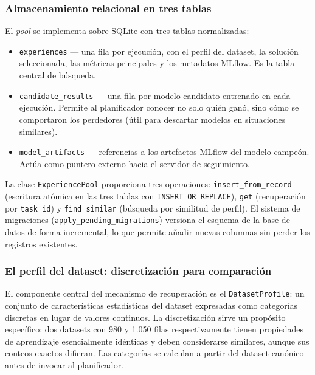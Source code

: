 \subsubsection*{Almacenamiento relacional en tres tablas}
\label{sec:experience-storage}

El \emph{pool} se implementa sobre SQLite con tres tablas normalizadas:

\begin{itemize}
  \item \texttt{experiences} — una fila por ejecución, con el perfil del dataset, la solución seleccionada, las métricas principales y los metadatos MLflow. Es la tabla central de búsqueda.
  \item \texttt{candidate\_results} — una fila por modelo candidato entrenado en cada ejecución. Permite al planificador conocer no solo quién ganó, sino cómo se comportaron los perdedores (útil para descartar modelos en situaciones similares).
  \item \texttt{model\_artifacts} — referencias a los artefactos MLflow del modelo campeón. Actúa como puntero externo hacia el servidor de seguimiento.
\end{itemize}

La clase \texttt{ExperiencePool} proporciona tres operaciones: \texttt{insert\_from\_record} (escritura atómica en las tres tablas con \texttt{INSERT OR REPLACE}), \texttt{get} (recuperación por \texttt{task\_id}) y \texttt{find\_similar} (búsqueda por similitud de perfil). El sistema de migraciones (\texttt{apply\_pending\_migrations}) versiona el esquema de la base de datos de forma incremental, lo que permite añadir nuevas columnas sin perder los registros existentes.

\subsubsection*{El perfil del dataset: discretización para comparación}
\label{sec:dataset-profile}

El componente central del mecanismo de recuperación es el \texttt{DatasetProfile}: un conjunto de características estadísticas del dataset expresadas como categorías discretas en lugar de valores continuos. La discretización sirve un propósito específico: dos datasets con 980 y 1.050 filas respectivamente tienen propiedades de aprendizaje esencialmente idénticas y deben considerarse similares, aunque sus conteos exactos difieran. Las categorías se calculan a partir del dataset canónico antes de invocar al planificador.

